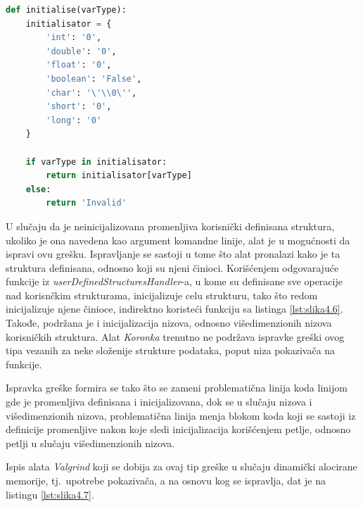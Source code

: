 \documentclass[12pt,oneside]{memoir}
\theoremstyle{plain}
\theoremstyle{definition}
\begin{document}
\begin{lstlisting}[style=mystyle,caption={Funkcija inicijalizacije}, label={lst:slika4.6},language={Python}] 
def initialise(varType):
	initialisator = {
		'int': '0',
		'double': '0',
		'float': '0',
		'boolean': 'False',
		'char': '\'\\0\'',
		'short': '0',
		'long': '0'
	}
	
	if varType in initialisator:
		return initialisator[varType]
	else:
		return 'Invalid'
\end{lstlisting}


U slučaju da je neinicijalizovana promenljiva korisnički definisana struktura, ukoliko je ona navedena kao argument komandne linije, alat je u mogućnosti da ispravi ovu grešku. Ispravljanje se sastoji u tome što alat pronalazi kako je ta struktura definisana, odnosno koji su njeni činioci. Korišćenjem odgovarajuće funkcije iz \textit{userDefinedStructuresHandler}-a, u kome su definisane sve operacije nad korisnčkim strukturama, inicijalizuje celu strukturu, tako što redom inicijalizuje njene činioce, indirektno koristeći funkciju sa listinga \ref{lst:slika4.6}. Takođe, podržana je i inicijalizacija nizova, odnosno višedimenzionih nizova korisničkih struktura. Alat \textit{Koronka} trenutno ne podržava ispravke greški ovog tipa vezanih za neke složenije strukture podataka, poput niza pokazivača na funkcije.

Ispravka greške formira se tako što se zameni problematična linija koda linijom gde je promenljiva definisana i inicijalizovana, dok se u slučaju nizova i višedimenzionih nizova, problematična linija menja blokom koda koji se sastoji iz definicije promenljive nakon koje sledi inicijalizacija korišćenjem petlje, odnosno petlji u slučaju višedimenzionih nizova. 

Ispis alata \textit{Valgrind} koji se dobija za ovaj tip greške u slučaju dinamički alocirane memorije, tj.~upotrebe pokazivača, a na osnovu kog se ispravlja, dat je na listingu \ref{lst:slika4.7}.

\end{document}

